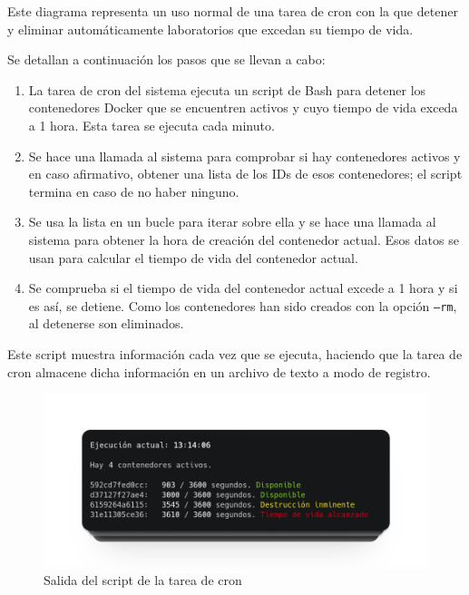             Este diagrama representa un uso normal de una tarea de cron con la que detener y eliminar automáticamente laboratorios que excedan su tiempo de vida.

            Se detallan a continuación los pasos que se llevan a cabo:

            \begin{enumerate}
                \item La tarea de cron del sistema ejecuta un script de Bash para detener los contenedores Docker que se encuentren activos y cuyo tiempo de vida exceda a 1 hora. Esta tarea se ejecuta cada minuto.

                \item Se hace una llamada al sistema para comprobar si hay contenedores activos y en caso afirmativo, obtener una lista de los IDs de esos contenedores; el script termina en caso de no haber ninguno.

                \item Se usa la lista en un bucle para iterar sobre ella y se hace una llamada al sistema para obtener la hora de creación del contenedor actual. Esos datos se usan para calcular el tiempo de vida del contenedor actual.
                
                \item Se comprueba si el tiempo de vida del contenedor actual excede a 1 hora y si es así, se detiene. Como los contenedores han sido creados con la opción \texttt{--rm}, al detenerse son eliminados.
            \end{enumerate}

            Este script muestra información cada vez que se ejecuta, haciendo que la tarea de cron almacene dicha información en un archivo de texto a modo de registro.

            \begin{figure}[htbp]
                \centering

                \includegraphics[scale=0.3]{images/Capturas/cron-log.png}

                \caption{Salida del script de la tarea de cron}
                \label{fig:detener-cron-log}
            \end{figure}

